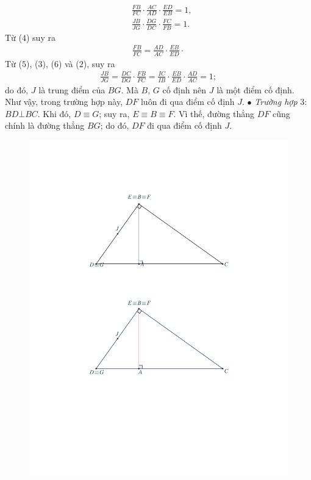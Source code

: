 \begin{multicols}{2}
	\begin{align*}
		&\frac{{FB}}{{FC}} \cdot \frac{{AC}}{{AD}} \cdot \frac{{ED}}{{EB}} = 1, \tag{$4$}\\
		&\frac{{JB}}{{JG}} \cdot \frac{{DG}}{{DC}} \cdot \frac{{FC}}{{FB}} = 1.\tag{$5$}
	\end{align*}
	Từ ($4$) suy ra
	\begin{align*}
		\frac{{FB}}{{FC}} = \frac{{AD}}{{AC}} \cdot \frac{{EB}}{{ED}} \cdot \tag{$6$}
	\end{align*}
	Từ ($5$), ($3$), ($6$) và ($2$), suy ra
	\begin{align*}
		\frac{{JB}}{{JG}} = \frac{{DC}}{{DG}} \cdot \frac{{FB}}{{FC}} = \frac{{IC}}{{IB}} \cdot \frac{{EB}}{{ED}} \cdot \frac{{AD}}{{AC}} = 1;
	\end{align*}
	do đó, $J$ là trung điểm của $BG$. Mà $B$, $G$ cố định nên $J$ là một điểm cố định.
	\vskip 0.05cm
	Như vậy, trong trường hợp này, $DF$ luôn đi qua điểm cố định $J$.
	\vskip 0.05cm
	$\bullet$ \textit{Trường hợp} $3$: $BD \bot BC$.
	\vskip 0.05cm
	Khi đó, $D \equiv G$; suy ra, $E \equiv B \equiv F$. Vì thế, đường thẳng $DF$ cũng chính là đường thẳng $BG$; do đó, $DF$ đi qua điểm cố định $J$.
	\begin{figure}[H]
		\centering
		\vspace*{-5pt}
		\captionsetup{labelformat= empty, justification=centering}
		\includegraphics[width=0.9\linewidth]{P615H2}

\end{figure}
\end{multicols}
